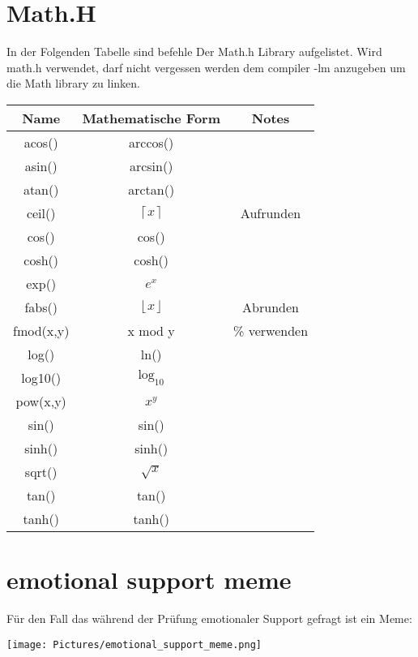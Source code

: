 \section{Math.H}

In der Folgenden Tabelle sind befehle Der Math.h Library aufgelistet. Wird math.h verwendet, darf nicht vergessen werden dem compiler -lm anzugeben um die Math library zu linken.\\
\begin{center}
    \begin{tabular}{ccc} 
         Name&  Mathematische Form& Notes\\ \hline
         acos()&  arccos()& \\ 
         asin()&  arcsin()& \\ 
         atan()&  arctan()& \\ 
         ceil()& $\left \lceil{x}\right \rceil$ & Aufrunden\\ 
         cos()& cos()& \\
         cosh()& cosh() & \\
         exp()& $e^x$ & \\
         fabs()& $\left \lfloor{x}\right \rfloor$ & Abrunden \\
         fmod(x,y) & x mod y& \% verwenden \\
         log() & ln()& \\
         log10() & $\text{log}_{10}$& \\
         pow(x,y) & $x^y$ & \\
         sin() & sin() & \\
         sinh() & sinh() & \\
         sqrt() & $\sqrt{x}$ & \\
         tan() & tan() & \\
         tanh() & tanh() & \\
    \end{tabular}
    
\end{center}

\vfill\null
\columnbreak	

\section{emotional support meme}

Für den Fall das während der Prüfung emotionaler Support gefragt ist ein Meme:
\begin{center}
\texttt{[image: Pictures/emotional\_support\_meme.png]}
    
\end{center}
